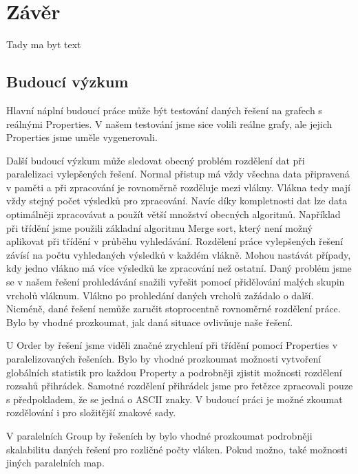 \chapter{Závěr}

Tady ma byt text

\section{Budoucí výzkum}

Hlavní náplní budoucí práce může být testování daných řešení na grafech s reálnými Properties.
V našem testování jsme sice volili reálne grafy, ale jejich Properties jsme uměle vygenerovali.

Další budoucí výzkum může sledovat obecný problém rozdělení dat při paralelizaci vylepšených řešení. 
Normal přistup má vždy všechna data připravená v paměti a při zpracování je rovnoměrně rozděluje mezi vlákny.
Vlákna tedy mají vždy stejný počet výsledků pro zpracování.
Navíc díky kompletnosti dat lze data optimálněji zpracovávat a použít větší množství obecných algoritmů.
Například při třídění jsme použili základní algoritmu Merge sort, který není možný aplikovat při třídění v průběhu vyhledávání.  
Rozdělení práce vylepšených řešení závísí na počtu vyhledaných výsledků v každém vlákně.
Mohou nastávát případy, kdy jedno vlákno má více výsledků ke zpracování než ostatní. 
Daný problém jsme se v našem řešení prohledávání snažili vyřešit pomocí přidělování malých skupin vrcholů vláknum.
Vlákno po prohledání daných vrcholů zažádalo o další.
Nicméně, dané řešení nemůže zaručit stoprocentně rovnoměrné rozdělení práce.
Bylo by vhodné prozkoumat, jak daná situace ovlivňuje naše řešení.

U Order by řešení jsme viděli značné zrychlení při třídění pomocí Properties v paralelizovaných řešeních.
Bylo by vhodné prozkoumat možnosti vytvoření globálních statistik pro každou Property a podrobněji zjistit možnosti rozdělení rozsahů přihrádek.
Samotné rozdělení přihrádek jsme pro řetězce zpracovali pouze s předpokladem, že se jedná o ASCII znaky.
V budoucí práci je možné zkoumat rozdělování i pro složitější znakové sady.

V paralelních Group by řešeních by bylo vhodné prozkoumat podrobněji skalabilitu daných řešení pro rozličné počty vláken.
Pokud možno, také možnosti jiných paralelních map.
 